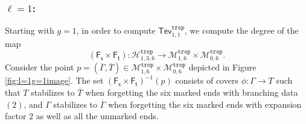 \documentclass[11pt,reqno]{amsart}
\theoremstyle{definition}
\newcommand\trop{{\mathtt{trop}}}
\newcommand\Mgn[1]{\mathcal M_{#1}}
\newcommand\Hur[1]{\mathcal H_{#1}}
\newcommand{\Ft}{\mathsf{F_t}}
\newcommand{\Fs}{\mathsf{F_s}}
\newcommand{\Tev}{{\mathsf{Tev}}}
\begin{document}
\subsubsection{$\ell=1$:}
Starting with $g=1$, in order to compute $\Tev^\trop_{1,1}$, we compute the degree of the map \begin{equation*}
   (\Fs\times\Ft):\Hur{1,3,6}^\trop \to \Mgn{1,6}^\trop \times \Mgn{0,6}^\trop.
\end{equation*}
Consider the point $p = (\overline{\Gamma}, \overline{T})\in \Mgn{1,6}^\trop \times \Mgn{0,6}^\trop$ depicted in Figure \ref{fig:l=1g=1image}. The set $(\Fs\times \Ft)^{-1}(p)$ consists of covers $\phi: \Gamma\to T$ such that $T$ stabilizes to 
$\overline{T}$ when forgetting  the six marked ends with branching data $(2)$,  and $\Gamma$ stabilizes to $\overline\Gamma$ when forgetting the six marked ends with expansion factor $2$ as well as all the unmarked ends.
\end{document}
